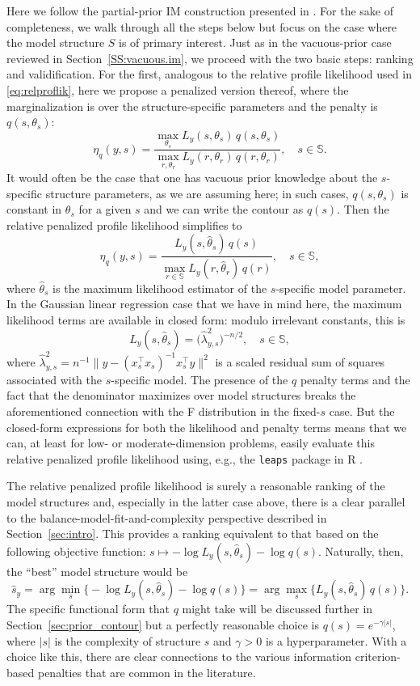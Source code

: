 \documentclass[12pt]{article}
\def\SS{\mathbb{S}}
\begin{document}
Here we follow the partial-prior IM construction presented in \citet{martin2022valid2}.  For the sake of completeness, we walk through all the steps below but focus on the case where the model structure $S$ is of primary interest.  Just as in the vacuous-prior case reviewed in Section~\ref{SS:vacuous.im}, we proceed with the two basic steps: ranking and validification.  For the first, analogous to the relative profile likelihood used in \eqref{eq:relproflik}, here we propose a penalized version thereof, where the marginalization is over the structure-specific parameters and the penalty is $q(s,\theta_s)$:
\[ \eta_q(y,s) = \frac{\max_{\theta_s} L_y(s,\theta_s) \, q(s,\theta_s)}{\max_{r,\theta_r} L_y(r,\theta_r) \, q(r, \theta_r)}, \quad s \in \SS. \]
It would often be the case that one has vacuous prior knowledge about the $s$-specific structure parameters, as we are assuming here; in such cases, $q(s,\theta_s)$ is constant in $\theta_s$ for a given $s$ and we can write the contour as $q(s)$.  Then the relative penalized profile likelihood simplifies to 
\[ \eta_q(y,s) = \frac{L_y(s,\hat\theta_s) \, q(s)}{\max_{r \in \SS} L_y(r,\hat\theta_r) \, q(r)}, \quad s \in \SS, \]
where $\hat\theta_s$ is the maximum likelihood estimator of the $s$-specific model parameter.  In the Gaussian linear regression case that we have in mind here, the maximum likelihood terms are available in closed form: modulo irrelevant constants, this is 
\[ L_y(s,\hat\theta_s) = \bigl( \hat\lambda_{y,s}^2 \bigr)^{-n/2}, \quad s \in \SS, \]
where $\hat\lambda_{y,s}^2 = n^{-1} \|y - (x_s^\top x_s)^{-1} x_s^\top y\|^2$ is a scaled residual sum of squares associated with the $s$-specific model.  The presence of the $q$ penalty terms and the fact that the denominator maximizes over model structures breaks the aforementioned connection with the F distribution in the fixed-$s$ case.  But the closed-form expressions for both the likelihood and penalty terms means that we can, at least for low- or moderate-dimension problems, easily evaluate this relative penalized profile likelihood using, e.g., the {\tt leaps} package in R \citep{leaps}.  

The relative penalized profile likelihood is surely a reasonable ranking of the model structures and, especially in the latter case above, there is a clear parallel to the balance-model-fit-and-complexity perspective described in Section~\ref{sec:intro}.  This provides a ranking equivalent to that based on the following objective function: 
$
s \mapsto -\log L_y(s,\hat\theta_s) - \log q(s). 
$
Naturally, then, the ``best'' model structure would be
\begin{equation}
\label{eq:s.hat}
\hat s_y = \arg\min_s \bigl\{ -\log L_y(s,\hat\theta_s) - \log q(s) \bigr\} = \arg\max_s \bigl\{ L_y(s,\hat\theta_s) \, q(s) \bigr\}. 
\end{equation}
The specific functional form that $q$ might take will be discussed further in Section~\ref{sec:prior_contour} but a perfectly reasonable choice is $q(s) = e^{-\gamma|s|}$, where $|s|$ is the complexity of structure $s$ and $\gamma > 0$ is a hyperparameter.  With a choice like this, there are clear connections to the various information criterion-based penalties that are common in the literature.  
\end{document}
